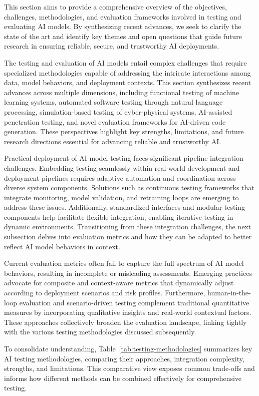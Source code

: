 \documentclass[sigconf]{acmart}
\begin{document}
This section aims to provide a comprehensive overview of the objectives, challenges, methodologies, and evaluation frameworks involved in testing and evaluating AI models. By synthesizing recent advances, we seek to clarify the state of the art and identify key themes and open questions that guide future research in ensuring reliable, secure, and trustworthy AI deployments.

The testing and evaluation of AI models entail complex challenges that require specialized methodologies capable of addressing the intricate interactions among data, model behaviors, and deployment contexts. This section synthesizes recent advances across multiple dimensions, including functional testing of machine learning systems, automated software testing through natural language processing, simulation-based testing of cyber-physical systems, AI-assisted penetration testing, and novel evaluation frameworks for AI-driven code generation. These perspectives highlight key strengths, limitations, and future research directions essential for advancing reliable and trustworthy AI.

Practical deployment of AI model testing faces significant pipeline integration challenges. Embedding testing seamlessly within real-world development and deployment pipelines requires adaptive automation and coordination across diverse system components. Solutions such as continuous testing frameworks that integrate monitoring, model validation, and retraining loops are emerging to address these issues. Additionally, standardized interfaces and modular testing components help facilitate flexible integration, enabling iterative testing in dynamic environments. Transitioning from these integration challenges, the next subsection delves into evaluation metrics and how they can be adapted to better reflect AI model behaviors in context.

Current evaluation metrics often fail to capture the full spectrum of AI model behaviors, resulting in incomplete or misleading assessments. Emerging practices advocate for composite and context-aware metrics that dynamically adjust according to deployment scenarios and risk profiles. Furthermore, human-in-the-loop evaluation and scenario-driven testing complement traditional quantitative measures by incorporating qualitative insights and real-world contextual factors. These approaches collectively broaden the evaluation landscape, linking tightly with the various testing methodologies discussed subsequently.

To consolidate understanding, Table~\ref{tab:testing-methodologies} summarizes key AI testing methodologies, comparing their approaches, integration complexity, strengths, and limitations. This comparative view exposes common trade-offs and informs how different methods can be combined effectively for comprehensive testing.
\end{document}
